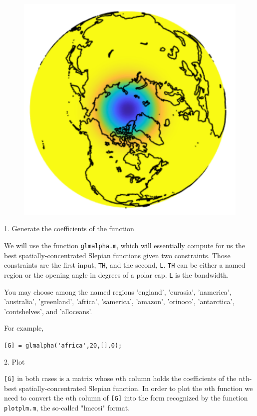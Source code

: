 \documentclass{article}
\begin{document}
\begin{figure}[H]
\includegraphics[scale=.75]{polarcap_ex}
\end{figure}

\setlength{\parskip}{0.5cm plus4mm minus3mm}

1. Generate the coefficients of the function

We will use  the function \verb!glmalpha.m!, which will essentially compute for us the best spatially-concentrated Slepian functions given two constraints. Those constraints are the first input, \verb!TH!, and the second, \verb!L!. \verb!TH! can be either a named region or the opening angle in degrees of a polar cap. \verb!L! is the bandwidth.

You may choose among the named regions 'england', 'eurasia',  'namerica', 'australia', 'greenland', 'africa', 'samerica', 'amazon', 'orinoco', 'antarctica', 'contshelves', and  'alloceans'.

For example, 

\verb![G] = glmalpha('africa',20,[],0);!


2. Plot

\verb![G]! in both cases is a matrix whose $n$th column holds the coefficients of the $n$th-best spatially-concentrated Slepian function. In order to plot the $n$th function we need to convert the $n$th column of \verb![G]! into the form recognized by the function \verb!plotplm.m!, the so-called "lmcosi" format.
\end{document}
